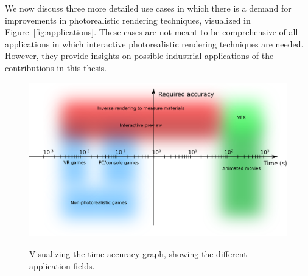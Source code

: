 We now discuss three more detailed use cases in which there is a demand for improvements in photorealistic rendering techniques, visualized in Figure~\ref{fig:applications}. These cases are not meant to be comprehensive of all applications in which interactive photorealistic rendering techniques are needed. However, they provide insights on possible industrial applications of the contributions in this thesis.


\begin{figure}
\centering
	 \includegraphics[width=\textwidth]{figures/photorealistic_diagram.png}  \\
\caption{Visualizing the time-accuracy graph, showing the  different application fields.} 
\label{fig:main_diagram}
\end{figure}


